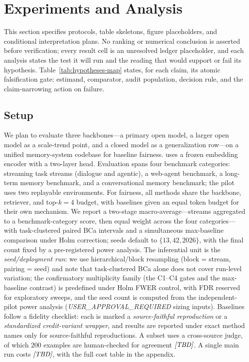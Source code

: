 \section{Experiments and Analysis}

This section specifies protocols, table skeletons, figure placeholders, and
conditional interpretation plans. No ranking or numerical conclusion is asserted
before verification; every result cell is an unresolved ledger placeholder, and
each analysis states the test it will run and the reading that would support or
fail its hypothesis. Table~\ref{tab:hypotheses-map} states, for each claim, its
atomic falsification gate: estimand, comparator, audit population, decision rule,
and the claim-narrowing action on failure.

\subsection{Setup}
We plan to evaluate three backbones---a primary open model, a larger open model as
a scale-trend point, and a closed model as a generalization row---on a unified
memory-system codebase for baseline fairness. \aca{} uses a frozen embedding
encoder with a two-layer head. Evaluation spans four benchmark categories:
streaming task streams (dialogue and agentic), a web-agent benchmark, a long-term
memory benchmark, and a conversational memory benchmark; the pilot uses two
replayable environments. For fairness, all methods share the backbone, retriever,
and top-$k = 4$ budget, with baselines given an equal token budget for their own
mechanism. We report a two-stage macro-average---streams aggregated to a
benchmark-category score, then equal weight across the four categories---with
task-clustered paired BCa intervals and a simultaneous max-baseline comparison
under Holm correction; seeds default to $\{13, 42, 2026\}$, with the final count
fixed by a pre-registered power analysis. The inferential unit is the
\emph{seed/deployment run}: we use hierarchical/block resampling (block = stream,
pairing = seed) and note that task-clustered BCa alone does not cover run-level
variation; the confirmatory multiplicity family (the C1--C4 gates and the
max-baseline contrast) is predefined under Holm FWER control, with FDR reserved for
exploratory sweeps, and the seed count is computed from the independent-pilot power
analysis (\emph{USER\_APPROVAL\_REQUIRED} sizing inputs). Baselines follow a
fidelity checklist: each is marked a \emph{source-faithful reproduction} or a
\emph{standardized credit-variant wrapper}, and results are reported under exact
method names only for source-faithful reproductions. A subset uses a cross-source
judge, of which $200$ examples are human-checked for agreement
$\tbd{JUDGE_HUMAN_AGREEMENT_KAPPA}$. A single main run costs
$\tbd{MAIN_GPU_HOURS_PER_RUN}$, with the full cost table in the appendix.


